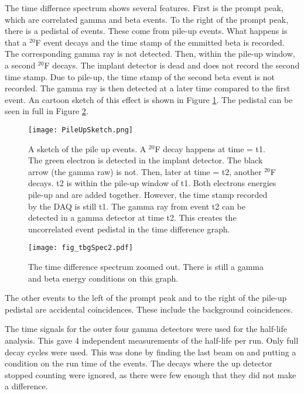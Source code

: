 The time differnce spectrum shows several features.
First is the prompt peak, which are correlated gamma and beta events. 
To the right of the prompt peak, there is a pedistal of events.
These come from pile-up events.
What happens is that a $^{20}$F event decays and the time stamp of the emmitted beta is recorded.
The corresponding gamma ray is not detected.
Then, within the pile-up window, a second $^{20}$F decays.  
The implant detector is dead and does not record the second time stamp.
Due to pile-up, the time stamp of the second beta event is not recorded.
The gamma ray is then detected at a later time compared to the first event.
An cartoon sketch of this effect is shown in Figure \ref{fig:PileUp}.
The pedistal can be seen in full in Figure \ref{fig:timediff2}.

\begin{figure}
	\centerline{\texttt{[image: PileUpSketch.png]}}
	\caption{A sketch of the pile up events.
		 A $^{20}$F decay happens at time = t1.
		 The green electron is detected in the implant detector.
		 The black arrow (the gamma raw) is not.
		 Then, later at time = t2, another $^{20}$F decays.
		 t2 is within the pile-up window of t1.
		 Both electrons energies pile-up and are added together.
		 However, the time stamp recorded by the DAQ is still t1.
		 The gamma ray from event t2 can be detected in a gamma detector at time t2.
		 This creates the uncorrelated event pedistal in the time difference graph.
		 }
	\label{fig:PileUp}
\end{figure}

\begin{figure}
	\centerline{\texttt{[image: fig\_tbgSpec2.pdf]}}	
	\caption{The time difference spectrum zoomed out.
		 There is still a gamma and beta energy conditions on this graph.}
	\label{fig:timediff2}
\end{figure}

The other events to the left of the prompt peak and to the right of the pile-up pedistal are accidental coincidences.
These include the background coincidences.

The time signals for the outer four gamma detectors were used for the half-life analysis.
This gave 4 independent measurements of the half-life per run. 
Only full decay cycles were used. 
This was done by finding the last beam on and putting a condition on the run time of the events.
The decays where the up detector stopped counting were ignored, as there were few enough that they did not make a difference. 

